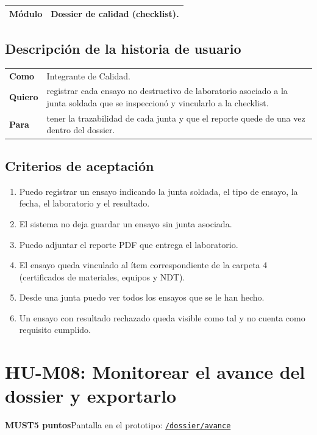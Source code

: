 \documentclass[11pt]{article}
\newcommand{\urlapp}{https://thankstochatgpt.github.io/LOARD}
\newcommand{\app}[1]{\href{\urlapp#1}{\texttt{#1}}}
\newcommand{\etiqueta}[1]{\colorbox{barra}{\textbf{\color{marca}#1}}}
\begin{document}
\begin{tabular}{>{\bfseries}p{2.4cm} p{13.4cm}}
\toprule
Módulo & Dossier de calidad (checklist). \\
\bottomrule
\end{tabular}

\subsection*{Descripción de la historia de usuario}

\begin{tabular}{>{\bfseries}p{2.4cm} p{13.4cm}}
\toprule
Como & Integrante de Calidad. \\
Quiero & registrar cada ensayo no destructivo de laboratorio asociado a la junta soldada que se inspeccionó y vincularlo a la checklist. \\
Para & tener la trazabilidad de cada junta y que el reporte quede de una vez dentro del dossier. \\
\bottomrule
\end{tabular}

\subsection*{Criterios de aceptación}

\begin{enumerate}
\item Puedo registrar un ensayo indicando la junta soldada, el tipo de ensayo, la fecha, el laboratorio y el resultado.
\item El sistema no deja guardar un ensayo sin junta asociada.
\item Puedo adjuntar el reporte PDF que entrega el laboratorio.
\item El ensayo queda vinculado al ítem correspondiente de la carpeta 4 (certificados de materiales, equipos y NDT).
\item Desde una junta puedo ver todos los ensayos que se le han hecho.
\item Un ensayo con resultado rechazado queda visible como tal y no cuenta como requisito cumplido.
\end{enumerate}


\newpage
\section*{HU-M08: Monitorear el avance del dossier y exportarlo}
\etiqueta{MUST}\quad\etiqueta{5 puntos}\quad Pantalla en el prototipo: \app{/dossier/avance}
\end{document}
